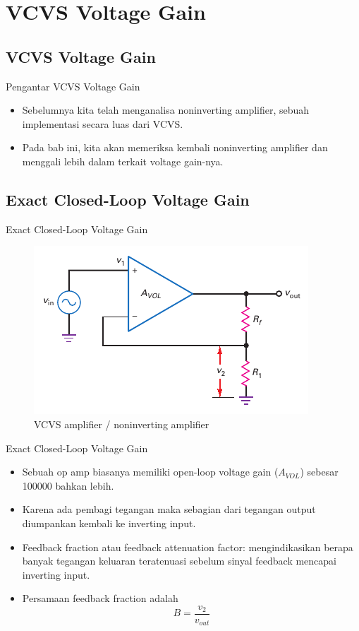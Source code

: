 \section{VCVS Voltage Gain}

\subsection{VCVS Voltage Gain}
\begin{frame}{Pengantar VCVS Voltage Gain}
	\begin{itemize}
		\item Sebelumnya kita telah menganalisa noninverting amplifier, sebuah implementasi secara luas dari VCVS.
		\item Pada bab ini, kita akan memeriksa kembali noninverting amplifier dan menggali lebih dalam terkait voltage gain-nya.
	\end{itemize}
\end{frame}

\subsection{Exact Closed-Loop Voltage Gain}
\begin{frame}{Exact Closed-Loop Voltage Gain}
	\begin{figure}
		\centering
		\includegraphics[height=0.7\textheight]{gambar/fig-17.03}
		\caption{VCVS amplifier / noninverting amplifier}
		\label{fig-17.03}
	\end{figure}
\end{frame}


\begin{frame}{Exact Closed-Loop Voltage Gain}
	\begin{itemize}
		\item Sebuah op amp biasanya memiliki open-loop voltage gain ($ A_{VOL} $) sebesar 100000 bahkan lebih.
		\item Karena ada pembagi tegangan maka sebagian dari tegangan output diumpankan kembali ke inverting input.
		\item Feedback fraction atau feedback attenuation factor: mengindikasikan berapa banyak tegangan keluaran teratenuasi sebelum sinyal feedback mencapai inverting input.
		\item Persamaan feedback fraction adalah
		\begin{equation}\label{pers-17.01}
			B = \frac{v_2}{v_{out}}
		\end{equation}
	\end{itemize}
\end{frame}

